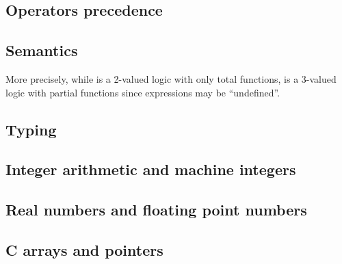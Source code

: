 
\subsection{Operators precedence}

\nodiff


\subsection{Semantics}
\label{sec:twovaluedlogic}


More precisely, while \acsl is a 2-valued logic with only total functions,
\eacsl is a 3-valued logic with partial functions since expressions may be
``undefined''.



\subsection{Typing}

\nodiff


\subsection{Integer arithmetic and machine integers}

\nodiff


\subsection{Real numbers and floating point numbers}

\nodiff


\subsection{C arrays and pointers}

